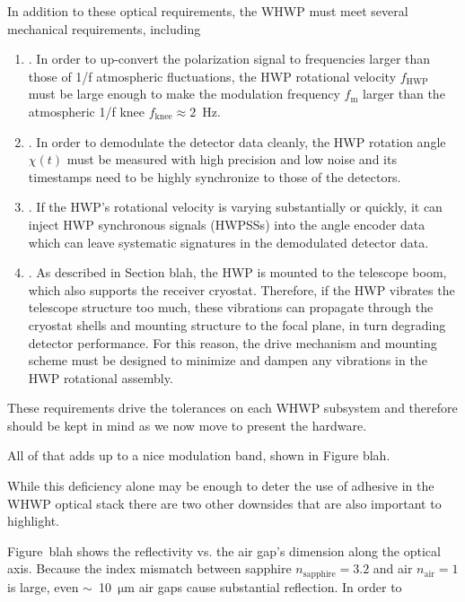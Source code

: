 In addition to these optical requirements, the WHWP must meet several mechanical requirements, including
\begin{enumerate}
    \item {}. In order to up-convert the polarization signal to frequencies larger than those of 1/f atmospheric fluctuations, the HWP rotational velocity $f_{\mathrm{HWP}}$ must be large enough to make the modulation frequency $f_{\mathrm{m}}$ larger than the atmospheric 1/f knee $f_{\mathrm{knee}} \approx 2$~Hz.
    \item {}. In order to demodulate the detector data cleanly, the HWP rotation angle $\chi(t)$ must be measured with high precision and low noise and its timestamps need to be highly synchronize to those of the detectors.
    \item {}. If the HWP's rotational velocity is varying substantially or quickly, it can inject HWP synchronous signals (HWPSSs) into the angle encoder data which can leave systematic signatures in the demodulated detector data.
    \item {}. As described in Section blah, the HWP is mounted to the telescope boom, which also supports the receiver cryostat. Therefore, if the HWP vibrates the telescope structure too much, these vibrations can propagate through the cryostat shells and mounting structure to the focal plane, in turn degrading detector performance. For this reason, the drive mechanism and mounting scheme must be designed to minimize and dampen any vibrations in the HWP rotational assembly.
\end{enumerate}
These requirements drive the tolerances on each WHWP subsystem and therefore should be kept in mind as we now move to present the hardware.

All of that adds up to a nice modulation band, shown in Figure blah.

While this deficiency alone may be enough to deter the use of adhesive in the WHWP optical stack there are two other downsides that are also important to highlight.


 Figure~blah shows the reflectivity vs. the air gap's dimension along the optical axis. Because the index mismatch between sapphire $n_{\mathrm{sapphire}} = 3.2$ and air $n_{\mathrm{air}} = 1$ is large, even $\sim$~10~$\mathrm{\mu m}$ air gaps cause substantial reflection. In order to 
 
